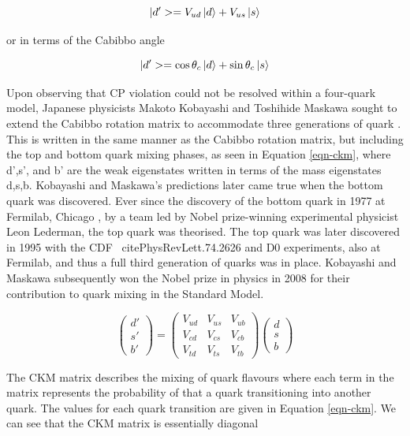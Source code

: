 \begin{equation}
|d'> = V_{ud}\ket{d} + V_{us}\ket{s}
\end{equation}

or in terms of the Cabibbo angle 

\begin{equation}
|d'> = \cos\theta_c\ket{d} + \sin\theta_c\ket{s}
\end{equation}

Upon observing that CP violation could not be resolved within a four-quark model, Japanese physicists Makoto Kobayashi and Toshihide Maskawa 
sought to extend the Cabibbo rotation matrix to accommodate three generations of quark \cite{Kobayashi:1973fv}. This is written in the same 
manner as the Cabibbo rotation matrix, but including the top and bottom quark mixing phases, as seen in Equation \ref{eqn-ckm}, where d',s', 
and b' are the weak eigenstates written in terms of the mass eigenstates d,s,b. Kobayashi and Maskawa's predictions later came true when the 
bottom quark was discovered. Ever since the discovery of the bottom quark in 1977 at Fermilab, Chicago \cite{Innes:1977ae}, by a team led by 
Nobel prize-winning experimental physicist Leon Lederman, the top quark was theorised. The top quark was later discovered in 1995 with the CDF \
cite{PhysRevLett.74.2626} and D0 \cite{PhysRevLett.74.2422} experiments, also at Fermilab, and thus a full third generation of quarks was in 
place. Kobayashi and Maskawa subsequently won the Nobel prize in physics in 2008 for their contribution to quark mixing in the Standard 
Model.   

\begin{equation} \label{equ-CKM}
\begin{pmatrix}
d' \\
s' \\
b' 
\end{pmatrix}
=
\begin{pmatrix}
V_{ud} & V_{us} & V_{ub} \\
V_{cd} & V_{cs} & V_{cb} \\
V_{td} & V_{ts} & V_{tb} 
\end{pmatrix}
\begin{pmatrix}
d \\
s \\
b 
\end{pmatrix}
\end{equation}

The CKM matrix describes the mixing of quark flavours where each term in the matrix represents the probability of that a quark transitioning into another quark. The values for each quark transition are given in Equation \ref{eqn-ckm}. We can see that the CKM matrix is essentially diagonal %

